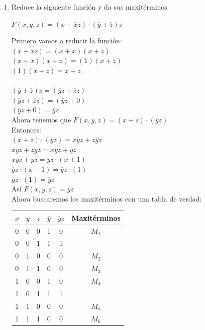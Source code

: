 \documentclass[a4paper,12pt]{article}
\begin{document}
\begin{enumerate}[label=\textcolor{teal}{\textbf{\arabic*.}}]
    \item Reduce la siguiente función y da sus maxitérminos
        \begin{center}
            $F(x,y,z) = (x + \overline{x} z) \cdot (\overline{y} + \overline{z}) z$
        \end{center}
        Primero vamos a reducir la función:\\
        $(x + \overline{x} z)=(x+\overline{x})(x+z)$\\
        $(x+\overline{x})(x+z)=(1)(x+z)$\\
        $(1)(x+z)=x+z$\\
        \\
        $(\overline{y} + \overline{z}) z= (\overline{y}z + \overline{z}z)$\\
        $(\overline{y}z + \overline{z}z)=(\overline{y}z +0)$\\
        $(\overline{y}z +0) = \overline{y}z$\\

        Ahora tenemos que $F(x,y,z) = (x+z) \cdot (\overline{y}z)$\\
        Entonces:\\
        $(x+z) \cdot (\overline{y}z) = x\overline{y}z +z\overline{y}z$\\
        $x\overline{y}z +z\overline{y}z = x\overline{y}z +\overline{y}z$\\
        $x\overline{y}z +\overline{y}z = \overline{y}z \cdot (x+1)$\\
        $\overline{y}z \cdot (x+1) = \overline{y}z \cdot (1)$\\
        $\overline{y}z \cdot (1) = \overline{y}z$\\
        Así $F(x,y,z) = \overline{y}z$\\
        Ahora buscaremos los maxitérminos con una tabla de verdad:\\
        \begin{table} [h]
            \centering
            \begin{tabular}{|c|c|c|c|c|c|}
                \hline
                $x$ & $y$ & $z$ & $\overline{y}$ & $\overline{y}z$ & Maxitérminos\\ \hline
                0 & 0 & 0 & 1 & 0 & $M_{1}$\\ \hline
                0 & 0 & 1 & 1 & 1 & \\ \hline
                0 & 1 & 0 & 0 & 0 & $M_{2}$\\ \hline
                0 & 1 & 1 & 0 & 0 & $M_{3}$\\ \hline
                1 & 0 & 0 & 1 & 0 & $M_{4}$\\ \hline
                1 & 0 & 1 & 1 & 1 & \\ \hline
                1 & 1 & 0 & 0 & 0 & $M_{5}$\\ \hline
                1 & 1 & 1 & 0 & 0 & $M_{6}$\\ \hline
            \end{tabular}
        \end{table}


\end{enumerate}
\end{document}
